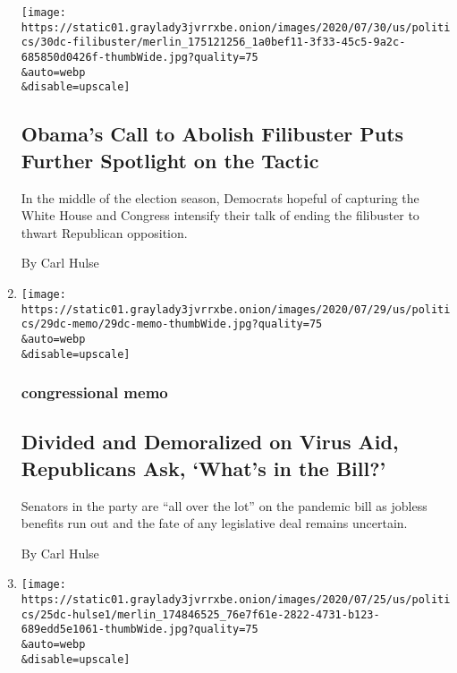 \begin{enumerate}
  \texttt{[image: https://static01.graylady3jvrrxbe.onion/images/2020/07/30/us/politics/30dc-filibuster/merlin\_175121256\_1a0bef11-3f33-45c5-9a2c-685850d0426f-thumbWide.jpg?quality=75\\\&auto=webp\\\&disable=upscale]}

  \hypertarget{obamas-call-to-abolish-filibuster-puts-further-spotlight-on-the-tactic}{%
  \subsection{Obama's Call to Abolish Filibuster Puts Further Spotlight
  on the
  Tactic}\label{obamas-call-to-abolish-filibuster-puts-further-spotlight-on-the-tactic}}

  In the middle of the election season, Democrats hopeful of capturing
  the White House and Congress intensify their talk of ending the
  filibuster to thwart Republican opposition.

  By Carl Hulse
\item
  \href{/2020/07/29/us/politics/republicans-congress-virus-aid.html}{}

  \texttt{[image: https://static01.graylady3jvrrxbe.onion/images/2020/07/29/us/politics/29dc-memo/29dc-memo-thumbWide.jpg?quality=75\\\&auto=webp\\\&disable=upscale]}

  \hypertarget{congressional-memo-1}{%
  \subsubsection{congressional memo}\label{congressional-memo-1}}

  \hypertarget{divided-and-demoralized-on-virus-aid-republicans-ask-whats-in-the-bill}{%
  \subsection{Divided and Demoralized on Virus Aid, Republicans Ask,
  `What's in the
  Bill?'}\label{divided-and-demoralized-on-virus-aid-republicans-ask-whats-in-the-bill}}

  Senators in the party are ``all over the lot'' on the pandemic bill as
  jobless benefits run out and the fate of any legislative deal remains
  uncertain.

  By Carl Hulse
\item
  \href{/2020/07/25/us/congress-broken-partisanship-coronavirus.html}{}

  \texttt{[image: https://static01.graylady3jvrrxbe.onion/images/2020/07/25/us/politics/25dc-hulse1/merlin\_174846525\_76e7f61e-2822-4731-b123-689edd5e1061-thumbWide.jpg?quality=75\\\&auto=webp\\\&disable=upscale]}


\end{enumerate}

